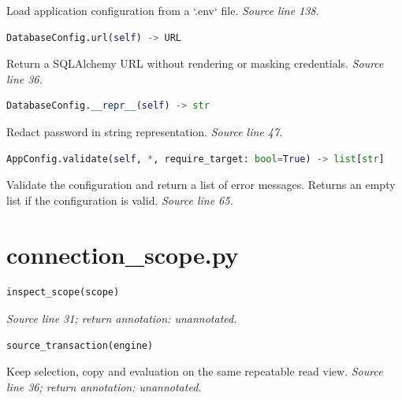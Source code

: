 {\small Load application configuration from a `.env` file. \textit{Source line 138.}}



\begin{lstlisting}[language=Python]
DatabaseConfig.url(self) -> URL
\end{lstlisting}


{\small Return a SQLAlchemy URL without rendering or masking credentials. \textit{Source line 36.}}



\begin{lstlisting}[language=Python]
DatabaseConfig.__repr__(self) -> str
\end{lstlisting}


{\small Redact password in string representation. \textit{Source line 47.}}



\begin{lstlisting}[language=Python]
AppConfig.validate(self, *, require_target: bool=True) -> list[str]
\end{lstlisting}


{\small Validate the configuration and return a list of error messages. Returns an empty list if the configuration is valid. \textit{Source line 65.}}

\section{connection\_scope.py}




\begin{lstlisting}[language=Python]
inspect_scope(scope)
\end{lstlisting}


{\small \textit{Source line 31; return annotation: unannotated.}}



\begin{lstlisting}[language=Python]
source_transaction(engine)
\end{lstlisting}


{\small Keep selection, copy and evaluation on the same repeatable read view. \textit{Source line 36; return annotation: unannotated.}}



